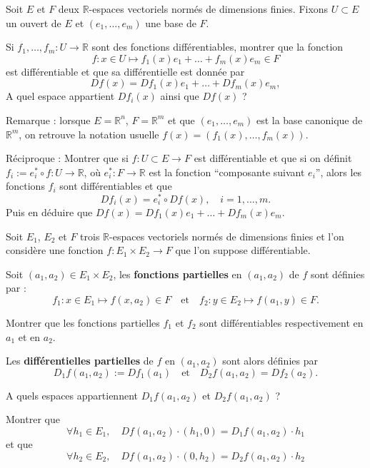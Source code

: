 \documentclass[11pt,a4paper]{article}
\begin{document}
\begin{exercice}
    Soit $E$ et $F$ deux $\mathbb R$-espaces vectoriels normés de dimensions finies. Fixons $U \subset E$ un ouvert de $E$ et $(e_1, \dots, e_m)$ une base de $F$. 
    \begin{questions} 
        \item Si $f_1, \dots, f_m : U \to \mathbb R$ sont des fonctions différentiables, montrer que la fonction 
        $$
            f : x \in U \mapsto f_1(x) e_1 + \dots + f_m(x) e_m \in F  
        $$
        est différentiable et que sa différentielle est donnée par 
        $$ 
            Df(x) = D f_1(x) e_1 + \dots + D f_m(x) e_m,                 
        $$
        A quel espace appartient $D f_i(x)$ ainsi que $Df(x)$ ? 

        Remarque : lorsque $E = \mathbb R^n$, $F = \mathbb R^m$ et que $(e_1, \dots, e_m)$ est la base canonique de $\mathbb R^m$, on retrouve la notation usuelle $f(x) = (f_1(x), \dots, f_m(x))$. 
        \item Réciproque : Montrer que si $f : U \subset E \to F$ est différentiable et que si on définit $f_i := e_i^* \circ f : U \to \mathbb R$, où $e_i^* : F \to \mathbb R$ est la fonction ``composante suivant $e_i$'', alors les fonctions $f_i$ sont différentiables et que 
        $$ 
            D f_i(x) = e_i^* \circ  Df(x), \quad i = 1, \dots, m. 
        $$
        Puis en déduire que $Df(x) = D f_1(x) e_1 + \dots + D f_m(x) e_m$. 
    \end{questions}
\end{exercice}

\begin{exercice}
    Soit $E_1$, $E_2$ et $F$ trois $\mathbb R$-espaces vectoriels normés de dimensions finies et l'on considère une fonction $f : E_1 \times E_2 \to F$ que l'on suppose différentiable.

    \smallskip 

    Soit $(a_1, a_2) \in E_1 \times E_2$, les \textbf{fonctions partielles} en $(a_1, a_2)$ de $f$ sont définies par : 
    $$
        f_1 : x \in E_1 \mapsto f(x, a_2) \in F 
        \quad \text{et} \quad 
        f_2 : y \in E_2 \mapsto f(a_1, y) \in F
        .
    $$
    \begin{questions}
        \item Montrer que les fonctions partielles $f_1$ et $f_2$ sont différentiables respectivement en $a_1$ et en $a_2$. 
        \item Les \textbf{différentielles partielles} de $f$ en $(a_1, a_2)$ sont alors définies par
        $$
        D_1 f(a_1, a_2) := D f_1(a_1) \quad \text{et} \quad D_2 f(a_1, a_2) = D f_2(a_2).
        $$
        
        A quels espaces appartiennent $D_1 f(a_1, a_2)$ et $D_2 f(a_1, a_2)$ ?
        \item Montrer que 
        $$ 
            \forall h_1 \in E_1, \quad D f(a_1, a_2) \cdot (h_1, 0) = D_1 f(a_1, a_2) \cdot h_1
        $$
        et que 
        $$ 
            \forall h_2 \in E_2, \quad D f(a_1, a_2) \cdot (0, h_2) = D_2 f(a_1, a_2) \cdot h_2
        $$
    \end{questions}
\end{exercice}
\end{document}
